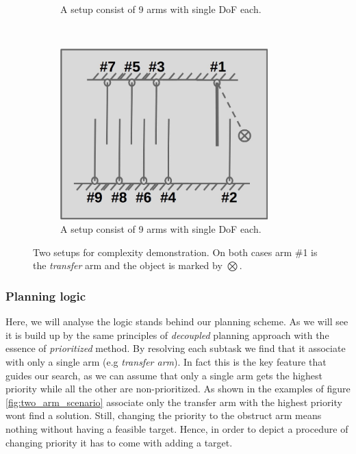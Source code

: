 \documentclass[english]{article}
\theoremstyle{definition}
\begin{document}
\begin{figure}[t]
\begin{subfigure}[b]{0.3\textwidth}
        \caption{A setup consist of 9 arms with single DoF each.}
        \label{fig:multi_arm_scenario}
    \end{subfigure} 
    ~~
    \begin{subfigure}[b]{0.3\textwidth}
    		\centering
        \includegraphics[width=0.88\textwidth]{no_need_centralized}
        \caption{A setup consist of 9 arms with single DoF each.}
        \label{fig:no_need_centralized}
    \end{subfigure}  
    \caption{Two setups for complexity demonstration. On both cases arm \#1 is the \textit{transfer} arm and the object is marked by $\bigotimes$.}
    \label{fig:two_setups_demo}
\end{figure}


\subsubsection*{Planning logic}
Here, we will analyse the logic stands behind our planning scheme. As we will see it is build up by the same principles of \textit{decoupled} planning approach with the essence of \textit{prioritized} method. By resolving each subtask we find that it associate with only a single arm (e.g \textit{transfer arm}). In fact this is the key feature that guides our search, as we can assume that only a single arm gets the highest priority while all the other are non-prioritized. As shown in the examples of figure \ref{fig:two_arm_scenario} associate only the transfer arm with the highest priority wont find a solution. Still, changing the priority to the obstruct arm means nothing without having a feasible target. Hence, in order to depict a procedure of changing priority it has to come with adding a target.   
\end{document}
